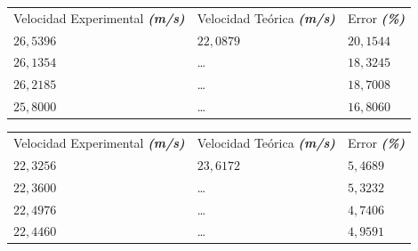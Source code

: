 \documentclass[twocolumn, 12pt]{article}
\newcommand{\bolditalic}[1]{\textbf{\textit{#1}}}
\begin{document}
\begin{table}[H]
    \begin{tabularx}{0.9\linewidth}{|>{\centering\arraybackslash}X|>{\centering\arraybackslash}X|>{\centering\arraybackslash}X|}
        \multicolumn{3}{c}{\large $M_{1}$}                                                                         \\\hline
        Velocidad Experimental \bolditalic{(m/s)} & Velocidad Teórica \bolditalic{(m/s)} & Error \bolditalic{(\%)} \\\hline
        $26,5396$                                 & $22,0879$                            & $20,1544$               \\\hline
        $26,1354$                                 & \dots                                & $18,3245$               \\\hline
        $26,2185$                                 & \dots                                & $18,7008$               \\\hline
        $25,8000$                                 & \dots                                & $16,8060$               \\\hline
    \end{tabularx}
\end{table}

\vspace{-.5cm}

\begin{table}[H]
    \begin{tabularx}{0.9\linewidth}{|>{\centering\arraybackslash}X|>{\centering\arraybackslash}X|>{\centering\arraybackslash}X|}
        \multicolumn{3}{c}{\large $M_{2}$}                                                                         \\\hline
        Velocidad Experimental \bolditalic{(m/s)} & Velocidad Teórica \bolditalic{(m/s)} & Error \bolditalic{(\%)} \\\hline
        $22,3256$                                 & $23,6172$                            & $5,4689$                \\\hline
        $22,3600$                                 & \dots                                & $5,3232$                \\\hline
        $22,4976$                                 & \dots                                & $4,7406$                \\\hline
        $22,4460$                                 & \dots                                & $4,9591$                \\\hline
    \end{tabularx}
\end{table}
\end{document}
